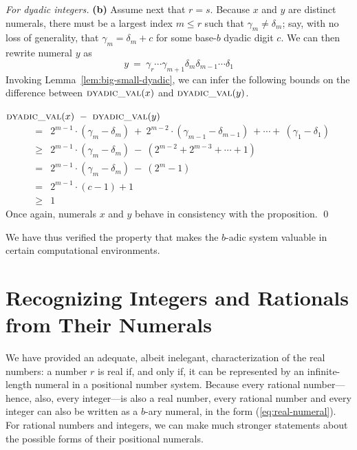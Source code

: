 \begin{proof}[For dyadic integers]
\smallskip

{\bf (b)} Assume next that $r = s$.  Because $x$ and $y$ are distinct numerals, there must be a largest index $m \leq r$ such that $\gamma_m \neq \delta_m$; say, with no loss of generality, that $\gamma_m = \delta_m + c$ for some base-$b$ dyadic digit $c$.  We can then rewrite numeral $y$ as
\[ y \ = \ \gamma_r \cdots \gamma_{m+1} \delta_m \delta_{m-1} \cdots \delta_1 \]
Invoking Lemma~\ref{lem:big-small-dyadic}, we can infer the following bounds on the difference between $\mbox{\sc dyadic\_val}(x)$ and $\mbox{\sc dyadic\_val}(y)$.

\bigskip

$\mbox{\sc dyadic\_val}(x) \ - \ \mbox{\sc dyadic\_val}(y)$
\begin{eqnarray*}
  & =  &
2^{m-1} \cdot (\gamma_m - \delta_m) \ + \ 2^{m-2} \cdot (\gamma_{m-1} - \delta_{m-1}) \ + \cdots + \  (\gamma_1 - \delta_1) \\
  & \geq &
2^{m-1} \cdot (\gamma_m - \delta_m) \ - \ \left( 2^{m-2} + 2^{m-3} + \cdots + 1 \right) \\
  & = &
2^{m-1} \cdot (\gamma_m - \delta_m)\ - \ \left( 2^m -1 \right) \\
  & = &
2^{m-1} \cdot (c-1) +1 \\
  & \geq & 1
\end{eqnarray*}
Once again, numerals $x$ and $y$ behave in consistency with the proposition.  \qed
\end{proof}

We have thus verified the property that makes the $b$-adic system valuable in certain computational environments.


\section{Recognizing Integers and  Rationals from Their Numerals}
\label{sec:special-numerals-N-Q}

We have provided an adequate, albeit inelegant, characterization of the real numbers: a number $r$ is real if, and only if, it can be represented by an infinite-length numeral in a positional number system.  Because every rational number---hence, also, every integer---is also a real number, every rational number and every integer can also be written as a $b$-ary numeral, in the form (\ref{eq:real-numeral}).  For rational numbers and integers, we can make much stronger statements about the possible forms of their positional numerals.

